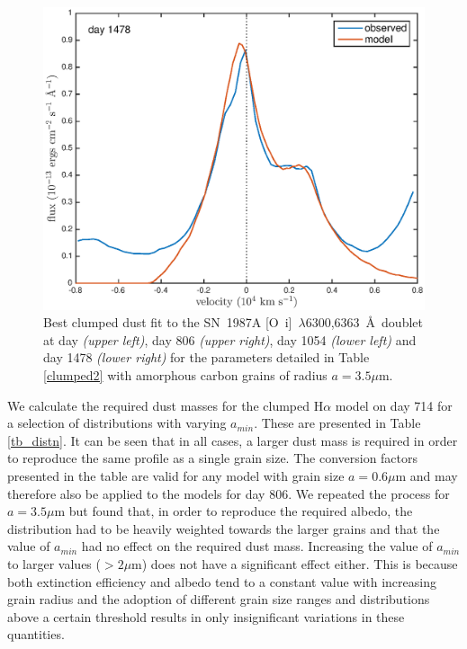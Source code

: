 \documentclass[useAMS,usenatbib,usegraphicx]{mnras}
\begin{document}
\begin{figure}
\begin{center}
\includegraphics[trim =33 10 45 15,clip=true,scale=0.41]{clump_1/maximum/d1478OI}
\caption{Best clumped dust fit to the SN~1987A [O~{\sc i}]~$\lambda$6300,6363~\AA\ doublet at day \textit{(upper left)}, day 806 \textit{(upper right)}, day 1054 \textit{(lower left)} and day 1478 \textit{(lower right)} for the parameters detailed in Table \ref{clumped2} with amorphous carbon grains of radius $a=3.5 \mu$m.}
\label{OI_clump2}
\end{center}
\end{figure}

We calculate the required dust masses for the clumped H$\alpha$ model on day 714 for a selection of distributions with varying $a_{min}$.  These are presented in Table \ref{tb_distn}.  It can be seen that in all cases, a larger dust mass is required in order to reproduce the same profile as a single grain size.  The conversion factors presented in the table are valid for any model with grain size $a=0.6\mu$m and may therefore also be applied to the models for day 806.  We repeated the process for $a=3.5 \mu$m but found that, in order to reproduce the required albedo, the distribution had to be heavily weighted towards the larger grains and that the value of $a_{min}$ had no effect on the required dust mass.  Increasing the value of $a_{min}$ to larger values ($>2\mu$m) does not have a significant effect either.  This is because both extinction efficiency and albedo tend to a constant value with increasing grain radius and the adoption of different grain size ranges and distributions above a certain threshold results in only insignificant variations in these quantities. 
\end{document}
